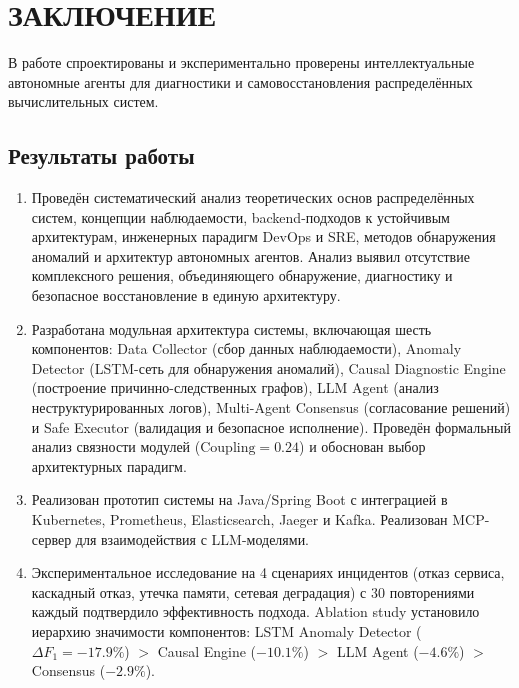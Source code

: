 \chapter*{ЗАКЛЮЧЕНИЕ}

В работе спроектированы и экспериментально проверены интеллектуальные автономные агенты для диагностики и самовосстановления распределённых вычислительных систем.
\section*{Результаты работы}

\begin{enumerate}
    \item Проведён систематический анализ теоретических основ распределённых систем, концепции наблюдаемости, backend-подходов к устойчивым архитектурам, инженерных парадигм DevOps и SRE, методов обнаружения аномалий и архитектур автономных агентов. Анализ выявил отсутствие комплексного решения, объединяющего обнаружение, диагностику и безопасное восстановление в единую архитектуру.

    \item Разработана модульная архитектура системы, включающая шесть компонентов: Data Collector (сбор данных наблюдаемости), Anomaly Detector (LSTM-сеть для обнаружения аномалий), Causal Diagnostic Engine (построение причинно-следственных графов), LLM Agent (анализ неструктурированных логов), Multi-Agent Consensus (согласование решений) и Safe Executor (валидация и безопасное исполнение). Проведён формальный анализ связности модулей ($\text{Coupling} = 0.24$) и обоснован выбор архитектурных парадигм.

    \item Реализован прототип системы на Java/Spring Boot с интеграцией в Kubernetes, Prometheus, Elasticsearch, Jaeger и Kafka. Реализован MCP-сервер для взаимодействия с LLM-моделями.

    \item Экспериментальное исследование на 4 сценариях инцидентов (отказ сервиса, каскадный отказ, утечка памяти, сетевая деградация) с 30 повторениями каждый подтвердило эффективность подхода. Ablation study установило иерархию значимости компонентов: LSTM Anomaly Detector ($\Delta F_1 = -17.9\%$) $>$ Causal Engine ($-10.1\%$) $>$ LLM Agent ($-4.6\%$) $>$ Consensus ($-2.9\%$).

\end{enumerate}

